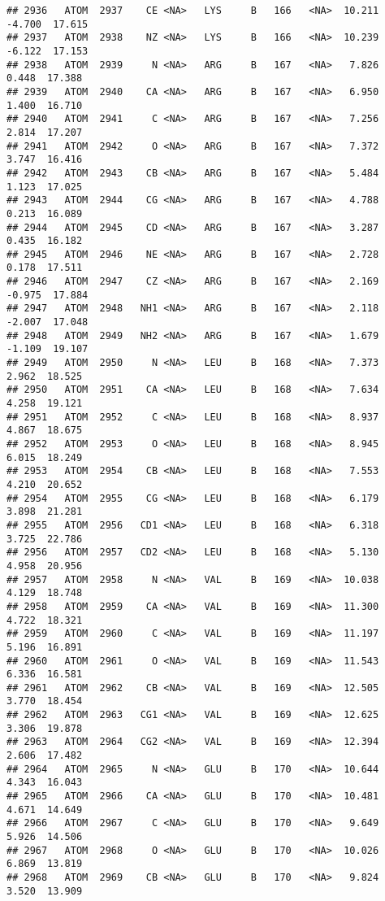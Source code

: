 \documentclass[
]{article}
\begin{document}
\begin{verbatim}
## 2936   ATOM  2937    CE <NA>   LYS     B   166   <NA>  10.211  -4.700  17.615
## 2937   ATOM  2938    NZ <NA>   LYS     B   166   <NA>  10.239  -6.122  17.153
## 2938   ATOM  2939     N <NA>   ARG     B   167   <NA>   7.826   0.448  17.388
## 2939   ATOM  2940    CA <NA>   ARG     B   167   <NA>   6.950   1.400  16.710
## 2940   ATOM  2941     C <NA>   ARG     B   167   <NA>   7.256   2.814  17.207
## 2941   ATOM  2942     O <NA>   ARG     B   167   <NA>   7.372   3.747  16.416
## 2942   ATOM  2943    CB <NA>   ARG     B   167   <NA>   5.484   1.123  17.025
## 2943   ATOM  2944    CG <NA>   ARG     B   167   <NA>   4.788   0.213  16.089
## 2944   ATOM  2945    CD <NA>   ARG     B   167   <NA>   3.287   0.435  16.182
## 2945   ATOM  2946    NE <NA>   ARG     B   167   <NA>   2.728   0.178  17.511
## 2946   ATOM  2947    CZ <NA>   ARG     B   167   <NA>   2.169  -0.975  17.884
## 2947   ATOM  2948   NH1 <NA>   ARG     B   167   <NA>   2.118  -2.007  17.048
## 2948   ATOM  2949   NH2 <NA>   ARG     B   167   <NA>   1.679  -1.109  19.107
## 2949   ATOM  2950     N <NA>   LEU     B   168   <NA>   7.373   2.962  18.525
## 2950   ATOM  2951    CA <NA>   LEU     B   168   <NA>   7.634   4.258  19.121
## 2951   ATOM  2952     C <NA>   LEU     B   168   <NA>   8.937   4.867  18.675
## 2952   ATOM  2953     O <NA>   LEU     B   168   <NA>   8.945   6.015  18.249
## 2953   ATOM  2954    CB <NA>   LEU     B   168   <NA>   7.553   4.210  20.652
## 2954   ATOM  2955    CG <NA>   LEU     B   168   <NA>   6.179   3.898  21.281
## 2955   ATOM  2956   CD1 <NA>   LEU     B   168   <NA>   6.318   3.725  22.786
## 2956   ATOM  2957   CD2 <NA>   LEU     B   168   <NA>   5.130   4.958  20.956
## 2957   ATOM  2958     N <NA>   VAL     B   169   <NA>  10.038   4.129  18.748
## 2958   ATOM  2959    CA <NA>   VAL     B   169   <NA>  11.300   4.722  18.321
## 2959   ATOM  2960     C <NA>   VAL     B   169   <NA>  11.197   5.196  16.891
## 2960   ATOM  2961     O <NA>   VAL     B   169   <NA>  11.543   6.336  16.581
## 2961   ATOM  2962    CB <NA>   VAL     B   169   <NA>  12.505   3.770  18.454
## 2962   ATOM  2963   CG1 <NA>   VAL     B   169   <NA>  12.625   3.306  19.878
## 2963   ATOM  2964   CG2 <NA>   VAL     B   169   <NA>  12.394   2.606  17.482
## 2964   ATOM  2965     N <NA>   GLU     B   170   <NA>  10.644   4.343  16.043
## 2965   ATOM  2966    CA <NA>   GLU     B   170   <NA>  10.481   4.671  14.649
## 2966   ATOM  2967     C <NA>   GLU     B   170   <NA>   9.649   5.926  14.506
## 2967   ATOM  2968     O <NA>   GLU     B   170   <NA>  10.026   6.869  13.819
## 2968   ATOM  2969    CB <NA>   GLU     B   170   <NA>   9.824   3.520  13.909

\end{verbatim}
\end{document}
